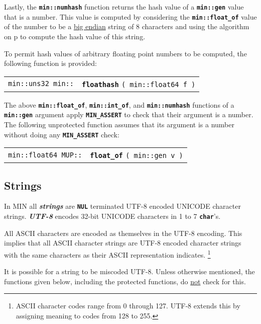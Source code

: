 \documentclass[12pt]{article}
\makeatletter
\newcommand{\TT}[1]{{\tt \bfseries #1}}
\newcommand{\key}[1]{{\bf \em #1}\index{#1}}
\newcommand{\skey}[2]{{\bf \em #1#2}\index{#1}}
\newcommand{\ttindex}[1]{\index{#1@{\tt #1}}}
\newcommand{\pagref}[1]{p\pageref{#1}}
\newenvironment{indpar}[1][0.3in]%
	{\begin{list}{}%
		     {\setlength{\itemsep}{0in}%
		      \setlength{\topsep}{0in}%
		      \setlength{\parsep}{1ex}%
		      \setlength{\labelwidth}{#1}%
		      \setlength{\leftmargin}{#1}%
		      \addtolength{\leftmargin}{\labelsep}}%
	 \item}%
	{\end{list}}
\newcommand{\LABEL}[1]{\label{#1}}
\newcommand{\MINKEY}[1]%
	   {\TT{#1}\ttindex{min::#1}\ttindex{#1}}
\newcommand{\MUPKEY}[1]%
	   {\TT{#1}\ttindex{MUP::#1}\ttindex{#1}}
\makeatother
\begin{document}
Lastly, the \TT{min::numhash} function
returns the hash value of a \TT{min::gen}
value that is a number.  This value is computed by considering
the \TT{min::float\_of} value of the number
to be a \underline{big endian} string of 8 characters and using the algorithm
on \pagref{HASH-ALGORITHM} to compute the hash value of this string.%
\label{NUMBER-HASH-ALGORITHM}

To permit hash values of arbitrary floating point numbers to be computed,
the following function is provided:

\begin{indpar}\begin{tabular}{r@{}l}
\verb|min::uns32 min::| & \MINKEY{floathash} \verb|( min::float64 f )|
\LABEL{MIN::FLOATHASH} \\
\end{tabular}\end{indpar}

The above \TT{min::float\_of}, \TT{min::int\_of}, and \TT{min::numhash}
functions of a \TT{min::gen} argument apply \TT{MIN\_ASSERT} to check
that their argument is a number.  The following unprotected function assumes
that its argument is a number without doing any \TT{MIN\_ASSERT} check:

\begin{indpar}\begin{tabular}{r@{}l}
\verb|min::float64 MUP::| & \MUPKEY{float\_of} \verb|( min::gen v )|
\LABEL{MUP::FLOAT_OF_GEN}
\end{tabular}\end{indpar}

\subsection{Strings}
\label{STRINGS}

In MIN all \skey{string}s
are \TT{NUL} terminated UTF-8 encoded UNICODE character strings.
\key{UTF-8} encodes 32-bit UNICODE characters in 1 to 7 \TT{char}'s.

All ASCII characters are encoded as themselves in
the UTF-8 encoding.  This implies that
all ASCII character strings are UTF-8 encoded character
strings with the same characters as their ASCII representation indicates.%
\footnote{ASCII character codes range from 0 through 127.  UTF-8 extends
this by assigning meaning to codes from 128 to 255.}

It is possible for a string to be miscoded UTF-8.  Unless otherwise
mentioned, the functions given below, including the protected functions,
do \underline{not} check for this.
\end{document}
